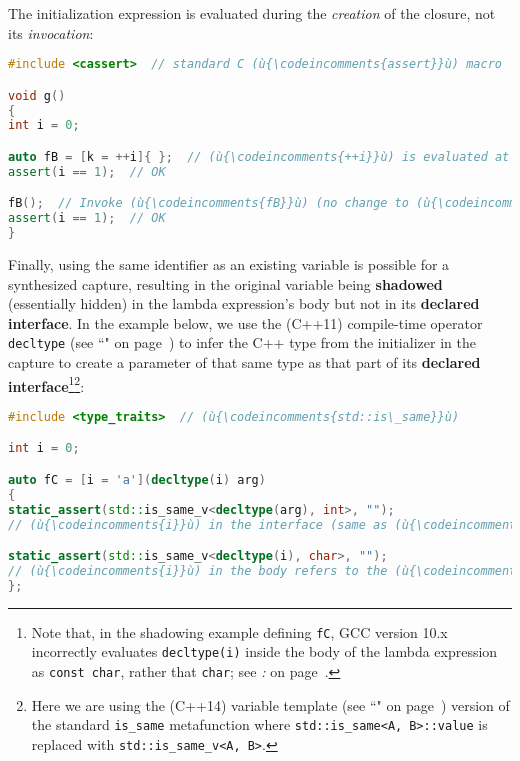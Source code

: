 \noindent The initialization expression is evaluated during the \emph{creation} of
the closure, not its \emph{invocation}:

\begin{lstlisting}[language=C++]
#include <cassert>  // standard C (ù{\codeincomments{assert}}ù) macro

void g()
{
int i = 0;

auto fB = [k = ++i]{ };  // (ù{\codeincomments{++i}}ù) is evaluated at creation only.
assert(i == 1);  // OK

fB();  // Invoke (ù{\codeincomments{fB}}ù) (no change to (ù{\codeincomments{i}}ù)).
assert(i == 1);  // OK
}
\end{lstlisting}

\noindent Finally, using the same identifier as an existing
variable is possible for a synthesized capture, resulting in the original variable
being \textbf{shadowed} (essentially hidden) in the lambda expression's
body but not in its \textbf{declared interface}. In the example below,
we use the (C++11) compile-time operator
\texttt{decltype} (see ``" on page~\pageref{decltype}) to infer the C++ type from the
initializer in the capture to create a parameter of that same type as
that part of its \textbf{declared interface}{\cprotect\footnote{Note
that, in the shadowing example defining \texttt{fC}, GCC version 10.x
incorrectly evaluates \texttt{decltype(i)} inside the body of the
lambda expression as \texttt{const}~\texttt{char}, rather that
\texttt{char}; see \textit{: } on page~\pageref{potential-pitfalls-lambdacapture}.}}{\cprotect\footnote{Here we are using the (C++14) variable
template (see ``" on page~\pageref{variable-templates}) version of the standard \texttt{is\_same} metafunction where \texttt{std::is\_same<A,}~\texttt{B>::value} is replaced with
\texttt{std::is\_same\_v<A,}~\texttt{B>}.}}:

\begin{lstlisting}[language=C++]
#include <type_traits>  // (ù{\codeincomments{std::is\_same}}ù)

int i = 0;

auto fC = [i = 'a'](decltype(i) arg)
{
static_assert(std::is_same_v<decltype(arg), int>, "");
// (ù{\codeincomments{i}}ù) in the interface (same as (ù{\codeincomments{arg}}ù)) refers to the (ù{\codeincomments{int}}ù) parameter.

static_assert(std::is_same_v<decltype(i), char>, "");
// (ù{\codeincomments{i}}ù) in the body refers to the (ù{\codeincomments{char}}ù) data member deduced at capture.
};
\end{lstlisting}

